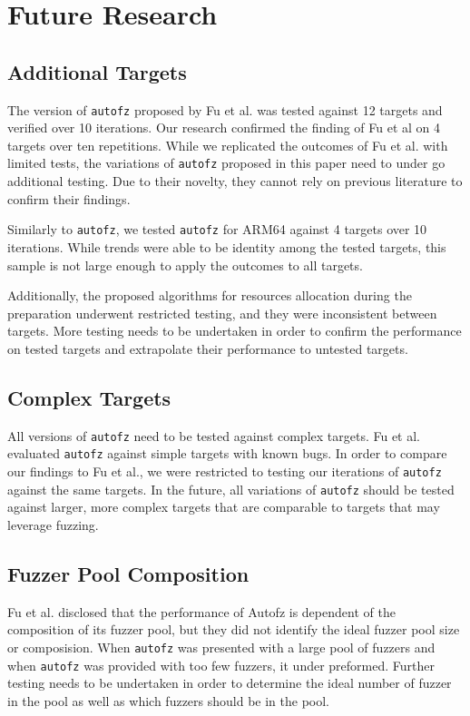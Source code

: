 \section{Future Research}
\subsection{Additional Targets} The version of \texttt{autofz} proposed by Fu et al. 
was tested against 12 targets and verified over 10 iterations. Our research  
confirmed the finding of Fu et al on 4 targets over ten repetitions. While we 
replicated the outcomes of Fu et al. with limited tests, the variations 
of \texttt{autofz} proposed in this paper need to under go additional testing. Due to their 
novelty, they cannot rely on previous literature to confirm their findings. \cite{fu_autofz_2023}

Similarly to \texttt{autofz}, we tested \texttt{autofz} for ARM64 against 4 targets over 10 
iterations. While trends were able to be identity among the tested targets, this
sample is not large enough to apply the outcomes to all targets. 

Additionally, the proposed algorithms for resources allocation during the preparation
underwent restricted testing, and they were inconsistent between targets. 
More testing needs to be undertaken in order to confirm the performance on tested targets and
extrapolate their performance to untested targets.

\subsection{Complex Targets} All versions of \texttt{autofz} need to be tested against 
complex targets. Fu et al. evaluated \texttt{autofz} against simple targets with known bugs. In 
order to compare our findings to Fu et al., we were restricted to testing our 
iterations of \texttt{autofz} against the same targets. In the future, all variations of 
\texttt{autofz} should be tested against larger, more complex targets that are comparable to
targets that may leverage fuzzing. \cite{fu_autofz_2023}

\subsection{Fuzzer Pool Composition} Fu et al. disclosed that the performance of
Autofz is dependent of the composition of its fuzzer pool, but they did not identify the ideal fuzzer pool size or 
composision. When \texttt{autofz} was presented
with a large pool of fuzzers and when \texttt{autofz} was provided with too few fuzzers, it 
under preformed. Further testing needs to be undertaken in order to determine the ideal
number of fuzzer in the pool as well as which fuzzers should be in the pool. \cite{fu_autofz_2023}


